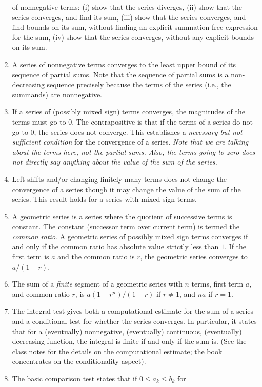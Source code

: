 \documentclass[10pt]{amsart}
\begin{document}
\begin{enumerate}
  of nonnegative terms: (i) show that the series diverges, (ii) show
  that the series converges, and find its sum, (iii) show that the
  series converges, and find bounds on its sum, without finding an
  explicit summation-free expression for the sum, (iv) show that the
  series converges, without any explicit bounds on its sum.
\item A series of nonnegative terms converges to the least upper bound
  of its sequence of partial sums. Note that the sequence of partial
  sums is a non-decreasing sequence precisely because the terms of the
  series (i.e., the summands) are nonnegative.
\item If a series of (possibly mixed sign) terms converges, the
  magnitudes of the terms must go to $0$. The contrapositive is that
  if the terms of a series do not go to $0$, the series does not
  converge. This establishes a {\em necessary but not sufficient
  condition} for the convergence of a series. {\em Note that we are
  talking about the terms here, not the partial sums. Also, the terms
  going to zero does not directly say anything about the value of the
  sum of the series.}
\item Left shifts and/or changing finitely many terms does not change
  the convergence of a series though it may change the value of the
  sum of the series. This result holds for a series with mixed sign
  terms.
\item A geometric series is a series where the quotient of successive
  terms is constant. The constant (successor term over current term)
  is termed the {\em common ratio}. A geometric series of possibly
  mixed sign terms converges if and only if the common ratio has
  absolute value strictly less than $1$. If the first term is $a$ and
  the common ratio is $r$, the geometric series converges to $a/(1 -
  r)$.
\item The sum of a {\em finite} segment of a geometric series with $n$
  terms, first term $a$, and common ratio $r$, is $a(1 - r^n)/(1 - r)$
  if $r \ne 1$, and $na$ if $r = 1$.
\item The integral test gives both a computational estimate for the
  sum of a series and a conditional test for whether the series
  converges. In particular, it states that for a (eventually)
  nonnegative, (eventually) continuous, (eventually) decreasing
  function, the integral is finite if and only if the sum is. (See the
  class notes for the details on the computational estimate; the book
  concentrates on the conditionality aspect).
\item The basic comparison test states that if $0 \le a_k \le b_k$ for

\end{enumerate}
\end{document}
